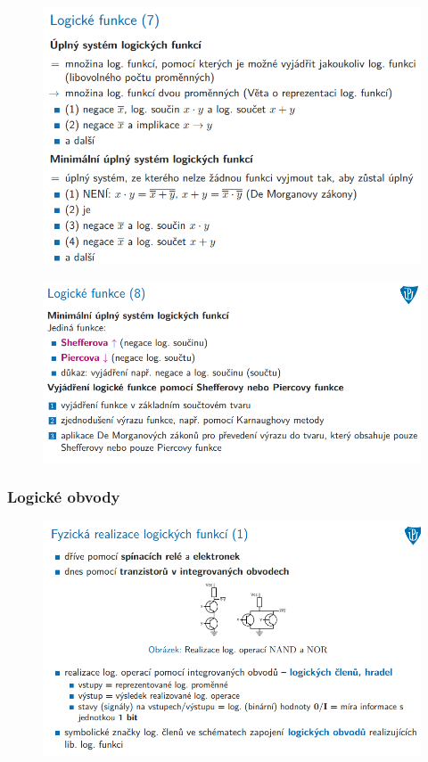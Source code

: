 \documentclass[10pt,a4paper]{article}
\begin{document}
\begin{figure} [h]
	\includegraphics[scale=0.65]{img/prvni_odstavec/otazka2/logicke_funkce8.png}	
\end{figure}

\begin{figure} [h]
	\includegraphics[scale=0.65]{img/prvni_odstavec/otazka2/logicke_funkce9.png}	
\end{figure}


\clearpage
\subsubsection{Logické obvody}
\begin{figure} [h]
	\includegraphics[scale=0.65]{img/prvni_odstavec/otazka2/fyzicka_realizace_logickych_funkci1.png}	
\end{figure}
\end{document}
